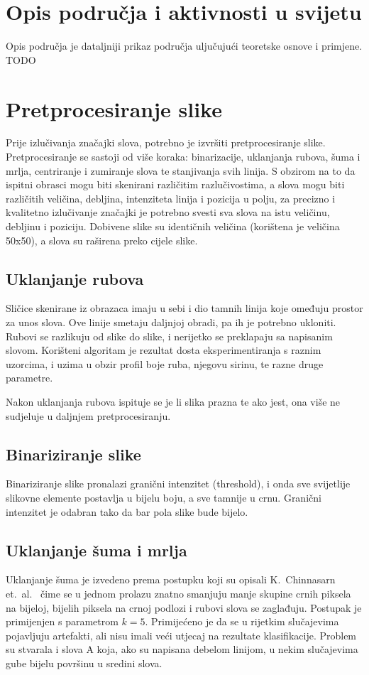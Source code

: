 \documentclass[a4paper,twocolumn,dvipdfm]{article}
\begin{document}
\section{Opis područja i aktivnosti u svijetu}
Opis područja je dataljniji prikaz područja uljučujući teoretske osnove i
primjene. TODO \cite{vamvakasoptical}

\section{Pretprocesiranje slike}
Prije izlučivanja značajki slova, potrebno je izvršiti pretprocesiranje slike.
Pretprocesiranje se sastoji od više koraka: binarizacije, uklanjanja rubova,
šuma i mrlja, centriranje i zumiranje slova te stanjivanja svih linija. S
obzirom na to da ispitni obrasci mogu biti skenirani različitim razlučivostima,
a slova mogu biti različitih veličina, debljina, intenziteta linija i pozicija u
polju, za precizno i kvalitetno izlučivanje značajki je potrebno svesti sva
slova na istu veličinu, debljinu i poziciju. Dobivene slike su identičnih
veličina (korištena je veličina 50x50), a slova su raširena preko cijele slike.

\subsection{Uklanjanje rubova}
Sličice skenirane iz obrazaca imaju u sebi i dio tamnih linija koje omeđuju prostor za unos slova.
Ove linije smetaju daljnjoj obradi, pa ih je potrebno ukloniti.
Rubovi se razlikuju od slike do slike, i nerijetko se preklapaju sa napisanim slovom.
Korišteni algoritam je rezultat dosta eksperimentiranja s raznim uzorcima, i uzima u obzir profil boje ruba, njegovu sirinu, te razne druge parametre.

Nakon uklanjanja rubova ispituje se je li slika prazna te ako jest, ona više ne sudjeluje u daljnjem pretprocesiranju.

\subsection{Binariziranje slike}
Binariziranje slike pronalazi granični intenzitet (threshold), i onda sve svijetlije slikovne elemente postavlja u bijelu boju, a sve tamnije u crnu.
Granični intenzitet je odabran tako da bar pola slike bude bijelo.

\subsection{Uklanjanje šuma i mrlja}
Uklanjanje šuma je izvedeno prema postupku koji su opisali K.\ Chinnasarn et.\
al.\ \cite{chinnasarn2002removing} čime se u jednom prolazu znatno smanjuju
manje skupine crnih piksela na bijeloj, bijelih piksela na crnoj podlozi i
rubovi slova se zaglađuju. Postupak je primijenjen s parametrom $k = 5$.
Primijećeno je da se u rijetkim slučajevima pojavljuju artefakti, ali nisu imali
veći utjecaj na rezultate klasifikacije. Problem su stvarala i slova A koja, ako
su napisana debelom linijom, u nekim slučajevima gube bijelu površinu u sredini
slova.
\end{document}

